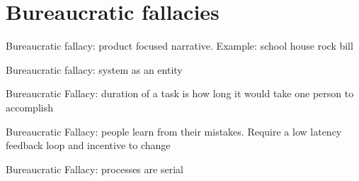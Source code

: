 \section{Bureaucratic fallacies}

Bureaucratic fallacy: product focused narrative. Example: school house rock bill

Bureaucratic fallacy: system as an entity

Bureaucratic Fallacy: duration of a task is how long it would take one person to accomplish

Bureaucratic Fallacy: people learn from their mistakes. Require a low latency feedback loop and incentive to change

Bureaucratic Fallacy: processes are serial